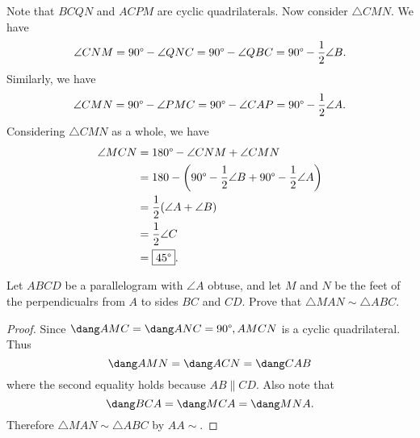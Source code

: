 \documentclass[letterpaper,oneside]{scrartcl}
\begin{document}
\begin{soln}
  Note that \(BCQN\) and \(ACPM\) are cyclic quadrilaterals. Now consider \(\triangle CMN\). We have 
\[\angle CNM = 90\degree - \angle QNC = 90\degree - \angle QBC = 90\degree - \frac12\angle B.\]
Similarly, we have
\[\angle CMN = 90\degree - \angle PMC = 90\degree - \angle CAP = 90\degree - \frac12\angle A.\]
Considering \(\triangle CMN\) as a whole, we have
\begin{align*}
\angle MCN &= 180\degree - \angle CNM + \angle CMN \\
&= 180- \left(90\degree - \frac12\angle B + 90\degree - \frac12\angle A\right)\\
&= \frac12(\angle A + \angle B) \\
&= \frac12\angle C\\
&= \fbox{\(45\degree\)}.
\end{align*}
\end{soln}
\begin{problem*}
  Let \(ABCD\) be a parallelogram with \(\angle A\) obtuse, and let \(M\) and \(N\) be the feet of the perpendicualrs from \(A\) to sides \(BC\) and \(CD\). Prove that \(\triangle MAN \sim \triangle ABC\).
\end{problem*}
\begin{proof}
  Since \(\dang AMC = \dang ANC = 90\degree, AMCN\) is a cyclic quadrilateral. Thus 
  \[\dang AMN = \dang ACN = \dang CAB\]
  where the second equality holds because \(AB \parallel CD\). Also note that 
  \[\dang BCA = \dang MCA = \dang MNA.\]
  Therefore \(\triangle MAN \sim \triangle ABC\) by \(AA\sim\).
\end{proof}
\end{document}
